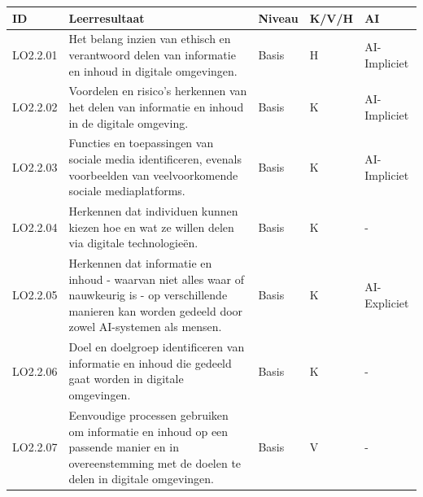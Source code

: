 \documentclass[
  dutch,
  letterpaper,
  DIV=11,
  numbers=noendperiod]{scrartcl}
\begin{document}
\begin{longtable}[]{@{}
  >{\centering\arraybackslash}p{}
  >{\centering\arraybackslash}p{}
  >{\centering\arraybackslash}p{}
  >{\centering\arraybackslash}p{}
  >{\centering\arraybackslash}p{}@{}}
\toprule\noalign{}
\begin{minipage}[b]{\linewidth}\centering
ID
\end{minipage} & \begin{minipage}[b]{\linewidth}\centering
Leerresultaat
\end{minipage} & \begin{minipage}[b]{\linewidth}\centering
Niveau
\end{minipage} & \begin{minipage}[b]{\linewidth}\centering
K/V/H
\end{minipage} & \begin{minipage}[b]{\linewidth}\centering
AI
\end{minipage} \\
\midrule\noalign{}
\endhead
\bottomrule\noalign{}
\endlastfoot
LO2.2.01 & Het belang inzien van ethisch en verantwoord delen van
informatie en inhoud in digitale omgevingen. & Basis & H &
AI-Impliciet \\
LO2.2.02 & Voordelen en risico's herkennen van het delen van informatie
en inhoud in de digitale omgeving. & Basis & K & AI-Impliciet \\
LO2.2.03 & Functies en toepassingen van sociale media identificeren,
evenals voorbeelden van veelvoorkomende sociale mediaplatforms. & Basis
& K & AI-Impliciet \\
LO2.2.04 & Herkennen dat individuen kunnen kiezen hoe en wat ze willen
delen via digitale technologieën. & Basis & K & - \\
LO2.2.05 & Herkennen dat informatie en inhoud - waarvan niet alles waar
of nauwkeurig is - op verschillende manieren kan worden gedeeld door
zowel AI-systemen als mensen. & Basis & K & AI-Expliciet \\
LO2.2.06 & Doel en doelgroep identificeren van informatie en inhoud die
gedeeld gaat worden in digitale omgevingen. & Basis & K & - \\
LO2.2.07 & Eenvoudige processen gebruiken om informatie en inhoud op een
passende manier en in overeenstemming met de doelen te delen in digitale
omgevingen. & Basis & V & - \\

\end{longtable}
\end{document}
